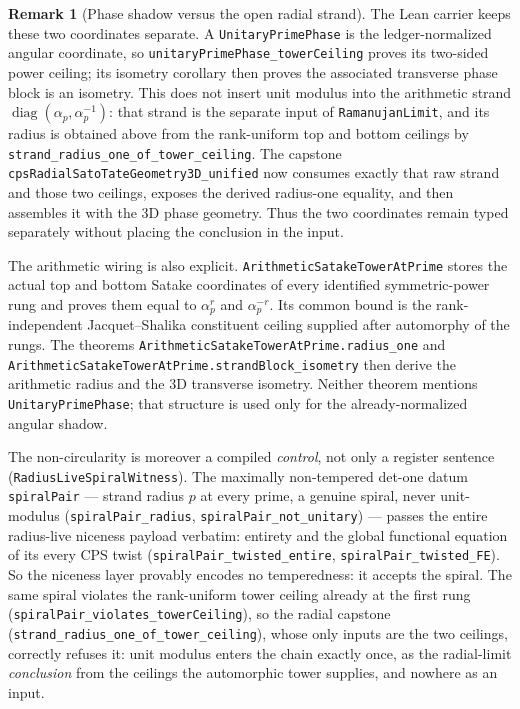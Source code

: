 \documentclass[11pt]{article}
\theoremstyle{definition}
\newtheorem{remark}[theorem]{Remark}
\begin{document}
\begin{remark}[Phase shadow versus the open radial strand]
The Lean carrier keeps these two coordinates separate. A
\texttt{UnitaryPrimePhase} is the ledger-normalized angular coordinate, so
\texttt{unitaryPrimePhase\_towerCeiling} proves its two-sided power ceiling; its isometry
corollary then proves the associated transverse phase block is an isometry. This does not insert unit modulus into the arithmetic strand
$\operatorname{diag}(\alpha_p,\alpha_p^{-1})$: that strand is the separate input of
\texttt{RamanujanLimit}, and its radius is obtained above from the rank-uniform top and bottom
ceilings by \texttt{strand\_radius\_one\_of\_tower\_ceiling}.  The capstone
\texttt{cpsRadialSatoTateGeometry3D\_unified} now consumes exactly that raw strand and those two
ceilings, exposes the derived radius-one equality, and then assembles it with the 3D phase geometry.
Thus the two coordinates remain typed separately without placing the conclusion in the input.

The arithmetic wiring is also explicit.  \texttt{ArithmeticSatakeTowerAtPrime} stores the actual
top and bottom Satake coordinates of every identified symmetric-power rung and proves them equal to
$\alpha_p^r$ and $\alpha_p^{-r}$.  Its common bound is the rank-independent
Jacquet--Shalika constituent ceiling supplied after automorphy of the rungs.  The theorems
\texttt{ArithmeticSatakeTowerAtPrime.radius\_one} and
\texttt{ArithmeticSatakeTowerAtPrime.strandBlock\_isometry} then derive the arithmetic radius and
the 3D transverse isometry.  Neither theorem mentions \texttt{UnitaryPrimePhase}; that structure is
used only for the already-normalized angular shadow.

The non-circularity is moreover a compiled \emph{control}, not only a register sentence
(\texttt{RadiusLiveSpiralWitness}).  The maximally non-tempered det-one datum
\texttt{spiralPair} --- strand radius $p$ at every prime, a genuine spiral, never unit-modulus
(\texttt{spiralPair\_radius}, \texttt{spiralPair\_not\_unitary}) --- passes the entire
radius-live niceness payload verbatim: entirety and the global functional equation of its every
CPS twist (\texttt{spiralPair\_twisted\_entire}, \texttt{spiralPair\_twisted\_FE}).  So the
niceness layer provably encodes no temperedness: it accepts the spiral.  The same spiral
violates the rank-uniform tower ceiling already at the first rung
(\texttt{spiralPair\_violates\_towerCeiling}), so the radial capstone
(\texttt{strand\_radius\_one\_of\_tower\_ceiling}), whose only inputs are the two ceilings,
correctly refuses it: unit modulus enters the chain exactly once, as the radial-limit
\emph{conclusion} from the ceilings the automorphic tower supplies, and nowhere as an input.
\end{remark}
\end{document}
